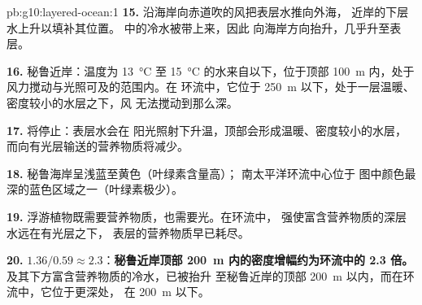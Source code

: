 \begin{solution}{pb:g10:layered-ocean:1}
\textbf{15.} 沿海岸向赤道吹的风把表层水推向外海，
近岸的下层水上升以填补其位置。
中的冷水被带上来，因此
向海岸方向抬升，几乎升至表层。

\textbf{16.} 秘鲁近岸：温度为 \qty{13}{\degreeCelsius} 至
\qty{15}{\degreeCelsius} 的水来自以下，位于顶部
\qty{100}{m} 内，处于风力搅动与光照可及的范围内。在
环流中，它位于 \qty{250}{m} 以下，处于一层温暖、密度较小的水层之下，风
无法搅动到那么深。

\textbf{17.} 将停止：表层水会在
阳光照射下升温，顶部会形成温暖、密度较小的水层，
而向有光层输送的营养物质将减少。

\textbf{18.} 秘鲁海岸呈浅蓝至黄色（叶绿素含量高）；
南太平洋环流中心位于
图中颜色最深的蓝色区域之一（叶绿素极少）。

\textbf{19.} 浮游植物既需要营养物质，也需要光。在环流中，
强使富含营养物质的深层水远在有光层之下，
表层的营养物质早已耗尽。

\textbf{20.} $1.36/0.59 \approx 2.3$：\textbf{秘鲁近岸顶部
\qty{200}{m} 内的密度增幅约为环流中的 2.3 倍。}
及其下方富含营养物质的冷水，已被抬升
至秘鲁近岸的顶部 \qty{200}{m} 以内，而在环流中，它位于更深处，
在 \qty{200}{m} 以下。
\end{solution}
